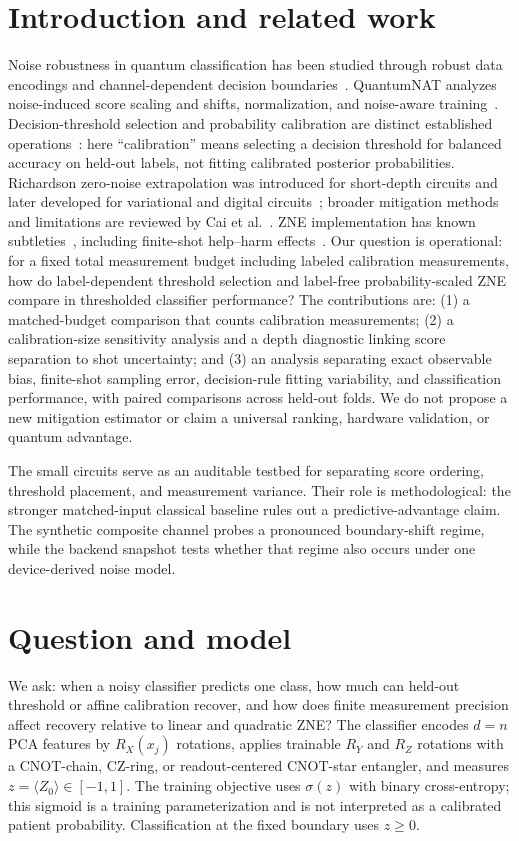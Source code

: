 \documentclass[conference]{IEEEtran}
\begin{document}
\section{Introduction and related work}
Noise robustness in quantum classification has been studied through robust data encodings and channel-dependent decision boundaries~\cite{larose2020}. QuantumNAT analyzes noise-induced score scaling and shifts, normalization, and noise-aware training~\cite{wang2022}. Decision-threshold selection and probability calibration are distinct established operations~\cite{hernandez2012,niculescu2005}: here ``calibration'' means selecting a decision threshold for balanced accuracy on held-out labels, not fitting calibrated posterior probabilities. Richardson zero-noise extrapolation was introduced for short-depth circuits and later developed for variational and digital circuits~\cite{temme2017,libenjamin2017,giurgica2020}; broader mitigation methods and limitations are reviewed by Cai et al.~\cite{cai2023}. ZNE implementation has known subtleties~\cite{majumdar2023}, including finite-shot help--harm effects~\cite{koester2026,scavino2026}. Our question is operational: for a fixed total measurement budget including labeled calibration measurements, how do label-dependent threshold selection and label-free probability-scaled ZNE compare in thresholded classifier performance? The contributions are: (1) a matched-budget comparison that counts calibration measurements; (2) a calibration-size sensitivity analysis and a depth diagnostic linking score separation to shot uncertainty; and (3) an analysis separating exact observable bias, finite-shot sampling error, decision-rule fitting variability, and classification performance, with paired comparisons across held-out folds. We do not propose a new mitigation estimator or claim a universal ranking, hardware validation, or quantum advantage.

The small circuits serve as an auditable testbed for separating score ordering, threshold placement, and measurement variance. Their role is methodological: the stronger matched-input classical baseline rules out a predictive-advantage claim. The synthetic composite channel probes a pronounced boundary-shift regime, while the backend snapshot tests whether that regime also occurs under one device-derived noise model.

\section{Question and model}
We ask: when a noisy classifier predicts one class, how much can held-out threshold or affine calibration recover, and how does finite measurement precision affect recovery relative to linear and quadratic ZNE? The classifier encodes $d=n$ PCA features by $R_X(x_j)$ rotations, applies trainable $R_Y$ and $R_Z$ rotations with a CNOT-chain, CZ-ring, or readout-centered CNOT-star entangler, and measures $z=\langle Z_0\rangle\in[-1,1]$. The training objective uses $\sigma(z)$ with binary cross-entropy; this sigmoid is a training parameterization and is not interpreted as a calibrated patient probability. Classification at the fixed boundary uses $z\geq0$.
\end{document}
